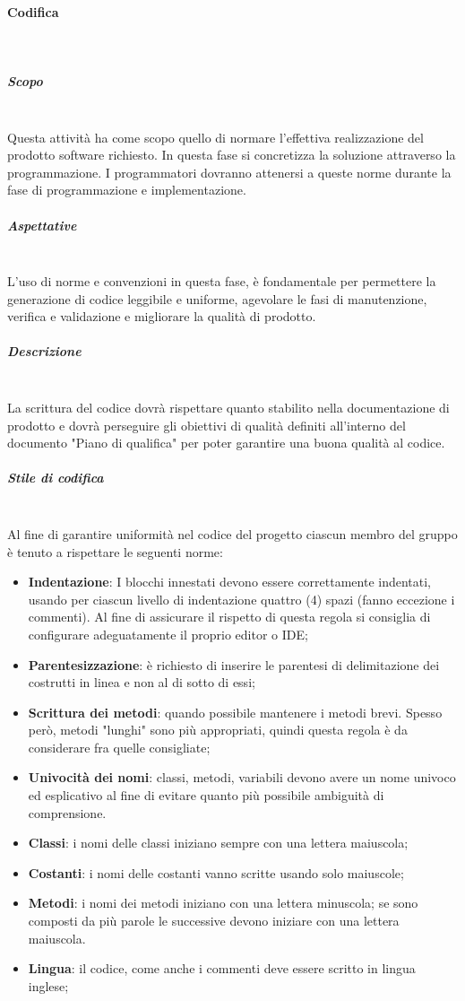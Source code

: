 		\paragraph{Codifica} \mbox{}\\
			\subparagraph{Scopo} \mbox{}\\
			Questa attività ha come scopo quello di normare l'effettiva realizzazione del prodotto software richiesto. In questa fase si concretizza la soluzione attraverso la programmazione. I programmatori dovranno attenersi a queste norme durante la fase di programmazione e implementazione.
			\subparagraph{Aspettative} \mbox{}\\
			L'uso di norme e convenzioni in questa fase, è fondamentale per permettere la generazione di codice leggibile e uniforme,  agevolare le fasi di manutenzione,  verifica e validazione e migliorare la qualità di prodotto.
			\subparagraph{Descrizione} \mbox{}\\
			La scrittura del codice dovrà rispettare quanto stabilito nella documentazione di prodotto e dovrà perseguire gli obiettivi di qualità definiti all’interno del documento "Piano di qualifica" per poter garantire una buona qualità al codice.
			\subparagraph{Stile di codifica} \mbox{}\\
			Al fine di garantire uniformità nel codice del progetto ciascun membro del gruppo è
			tenuto a rispettare le seguenti norme:
			\begin{itemize}
				\item \textbf{Indentazione}: I blocchi innestati devono essere correttamente indentati, usando per ciascun livello di indentazione quattro (4) spazi (fanno eccezione i commenti). Al fine di assicurare il rispetto di questa regola si consiglia di configurare adeguatamente il proprio editor o IDE; %
				\item \textbf{Parentesizzazione}: è richiesto di inserire le parentesi di delimitazione dei costrutti in linea e non al di sotto di essi;
				\item \textbf{Scrittura dei metodi}: quando possibile mantenere i metodi brevi. Spesso però, metodi "lunghi" sono più appropriati, quindi questa regola è da considerare fra quelle consigliate;
				\item \textbf{Univocità dei nomi}: classi, metodi, variabili devono avere un nome univoco	ed esplicativo al fine di evitare quanto più possibile ambiguità di comprensione.
				\item \textbf{Classi}: i nomi delle classi iniziano sempre con una lettera maiuscola;
				\item \textbf{Costanti}: i nomi delle costanti vanno scritte usando solo maiuscole;
				\item \textbf{Metodi}: i nomi dei metodi iniziano con una lettera minuscola;
				se sono composti da più parole le successive devono iniziare con una lettera
				maiuscola.
				\item \textbf{Lingua}: il codice, come anche i commenti deve essere scritto in lingua inglese;
			\end{itemize}
